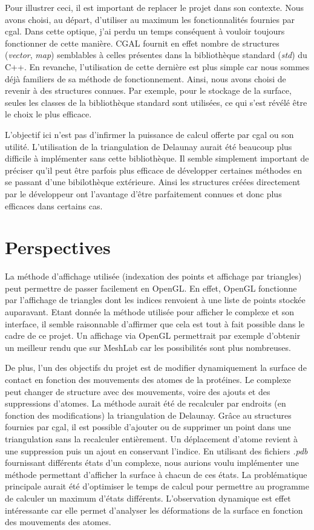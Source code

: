 Pour illustrer ceci, il est important de replacer le projet dans son contexte. Nous avons
choisi, au départ, d'utiliser au maximum les fonctionnalités fournies par \gls{cgal}.
Dans cette optique, j'ai perdu un temps conséquent à vouloir toujours fonctionner de cette manière.
CGAL fournit en effet nombre de structures (\textit{vector}, \textit{map}) semblables
à celles présentes dans la bibliothèque standard (\textit{std}) du C++. En revanche, l'utilisation
de cette dernière est plus simple car nous sommes déjà familiers de sa méthode de fonctionnement.
Ainsi, nous avons choisi de revenir à des structures connues. Par exemple, pour le stockage de la
surface, seules les classes de la bibliothèque standard sont utilisées, ce qui s'est
révélé être le choix le plus efficace.

L'objectif ici n'est pas d'infirmer la puissance de calcul offerte par \gls{cgal} ou son utilité.
L'utilisation de la triangulation de Delaunay aurait été beaucoup plus difficile
à implémenter sans cette bibliothèque. Il semble simplement important de préciser qu'il peut être
parfois plus efficace de développer certaines méthodes en se passant d'une bibilothèque extérieure.
Ainsi les structures créées directement par le développeur ont l'avantage d'être
parfaitement connues et donc plus efficaces dans certains cas.

\section{Perspectives}

La méthode d'affichage utilisée (indexation des points et affichage par triangles)
peut permettre de passer facilement en OpenGL. En effet, OpenGL fonctionne par l'affichage
de triangles dont les indices renvoient à une liste de points stockée auparavant.
Etant donnée la méthode utilisée pour afficher le complexe et son interface, il semble
raisonnable d'affirmer que cela est tout à fait possible dans le cadre de ce projet.
Un affichage via OpenGL permettrait par exemple d'obtenir un meilleur rendu que sur
MeshLab car les possibilités sont plus nombreuses.

De plus, l'un des objectifs du projet est de modifier dynamiquement la surface de contact
en fonction des mouvements des atomes de la protéines. Le complexe peut changer de structure
avec des mouvements, voire des ajouts et des suppressions d'atomes. La méthode aurait été
de recalculer par endroits (en fonction des modifications) la triangulation de Delaunay.
Grâce au structures fournies par \gls{cgal}, il est possible d'ajouter ou de supprimer
un point dans une triangulation sans la recalculer entièrement. Un déplacement d'atome
revient à une suppression puis un ajout en conservant l'indice. En utilisant des fichiers \textit{.pdb}
fournissant différents états d'un complexe, nous aurions voulu implémenter une méthode
permettant d'afficher la surface à chacun de ces états. La problématique principale
aurait été d'optimiser le temps de calcul pour permettre au programme de calculer un maximum
d'états différents. L'observation dynamique est effet intéressante car elle permet d'analyser
les déformations de la surface en fonction des mouvements des atomes.

